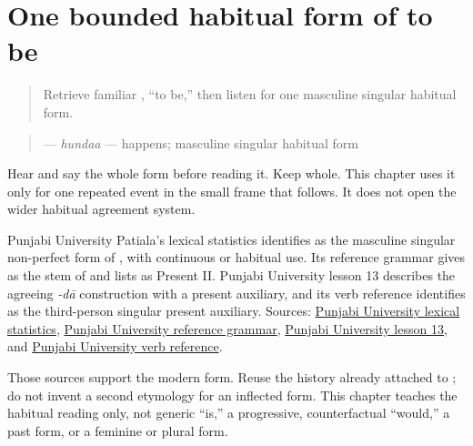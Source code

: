 \section[\texorpdfstring{\pa{ਹੁੰਦਾ} (hundaa)}{ਹੁੰਦਾ (hundaa)}]{One bounded habitual form of to be}

\label{lesson:PA-C207-hundaa}



\begin{quote}
Retrieve familiar \textbf{}, “to be,” then listen for one masculine singular habitual form.
\end{quote}

\begin{grammarlens}[title={Grammar Lens: direct owner}]
\begin{quote}
\textbf{} — \emph{hundaa} — happens; masculine singular habitual form
\end{quote}

Hear and say the whole form before reading it. Keep \textbf{} whole. This chapter uses it only for one repeated event in the small frame that follows. It does not open the wider habitual agreement system.
\end{grammarlens}

\begin{cousinweb}
Punjabi University Patiala's lexical statistics identifies \textbf{} as the masculine singular non-perfect form of \textbf{}, with continuous or habitual use. Its reference grammar gives \textbf{} as the stem of \textbf{} and lists \textbf{} as Present II. Punjabi University lesson 13 describes the agreeing \emph{-dā} construction with a present auxiliary, and its verb reference identifies \textbf{} as the third-person singular present auxiliary. Sources: \href{https://www.learnpunjabi.org/statistics.html}{Punjabi University lexical statistics}, \href{https://pt.learnpunjabi.org/assets/A\%20Reference\%20Grammar\_Final.pdf}{Punjabi University reference grammar}, \href{https://pt.learnpunjabi.org/lesson13.aspx?l=13}{Punjabi University lesson 13}, and \href{https://www.learnpunjabi.org/verb.html}{Punjabi University verb reference}.

Those sources support the modern form. Reuse the history already attached to \textbf{}; do not invent a second etymology for an inflected form. This chapter teaches the habitual reading only, not generic “is,” a progressive, counterfactual “would,” a past form, or a feminine or plural form.
\end{cousinweb}

